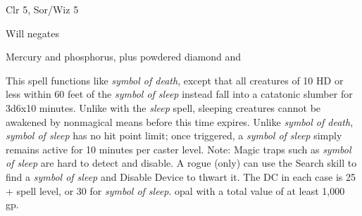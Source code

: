 
\begin{description*}
\item[Level:] Clr 5, Sor/Wiz 5
\item[Saving Throw:] Will negates
\item[Arcane Material Component:] Mercury and phosphorus, plus powdered diamond and
\end{description*}

This spell functions like \textit{symbol of death}, except that all creatures of
10 HD or less within 60 feet of the \textit{symbol of sleep} instead fall into
a catatonic slumber for 3d6x10 minutes. Unlike with the \textit{sleep} spell, sleeping
creatures cannot be awakened by nonmagical means before this time expires.
Unlike \textit{symbol of death}, \textit{symbol of sleep} has no hit point limit;
once triggered, a \textit{symbol of sleep} simply remains active for 10 minutes
per caster level.
Note: Magic traps such as \textit{symbol of sleep} are hard to detect
and disable. A rogue (only) can use the Search skill to find a \textit{symbol of
sleep} and Disable Device to thwart it. The DC in each case is 25 + spell level,
or 30 for \textit{symbol of sleep}.
opal with a total value of at least 1,000 gp.